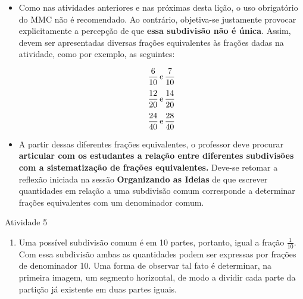 \begin{multicols}{2}
  \begin{itemize} %
    \item       Como nas atividades anteriores e nas próximas desta lição, o uso obrigatório do MMC não é recomendado. Ao contrário, objetiva-se justamente provocar explicitamente a percepção de que       {\bf essa subdivisão não é única}. Assim, devem ser apresentadas diversas frações equivalentes às frações dadas na atividade, como por exemplo, as seguintes:

  $$\frac{6}{10} \,{\rm e} \, \frac{7}{10}$$
  $$\frac{12}{20} \,{\rm e} \, \frac{14}{20}$$
  $$\frac{24}{40} \,{\rm e} \, \frac{28}{40}$$

    \item       A partir dessas diferentes frações equivalentes, o professor deve procurar       {\bf articular com os estudantes a relação entre diferentes subdivisões com a sistematização de frações equivalentes.}       Deve-se retomar a reflexão iniciada na sessão       {\bf Organizando as Ideias}       de que escrever quantidades em relação a uma subdivisão comum corresponde a determinar frações equivalentes com um denominador comum.
\end{itemize} %

\begin{resposta*}{Atividade 5}
\begin{enumerate} [\quad a)] %
    \item       Uma possível subdivisão comum é em 10 partes, portanto, igual a fração       $\frac{1}{10}$. Com essa subdivisão ambas as quantidades podem ser expressas por frações de denominador 10. Uma forma de observar tal fato é determinar, na primeira imagem, um segmento horizontal, de modo a dividir cada parte da partição já existente em duas partes iguais.

    \begin{center}
\end{center}


\end{enumerate}
\end{resposta*}
\end{multicols}

